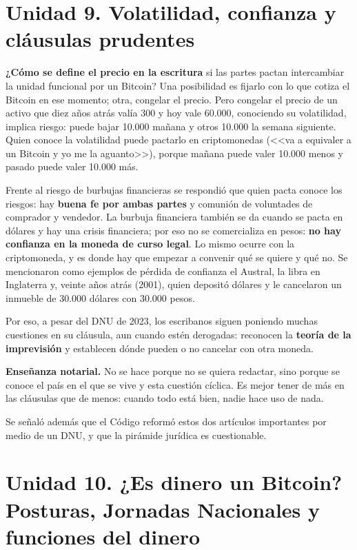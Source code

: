 \documentclass[12pt,oneside,a4paper]{book}
\begin{document}
\section{Unidad 9. Volatilidad, confianza y cláusulas prudentes}

\textbf{¿Cómo se define el precio en la escritura} si las partes pactan intercambiar la unidad funcional por un Bitcoin? Una posibilidad es fijarlo con lo que cotiza el Bitcoin en ese momento; otra, congelar el precio. Pero congelar el precio de un activo que diez años atrás valía 300 y hoy vale 60.000, conociendo su volatilidad, implica riesgo: puede bajar 10.000 mañana y otros 10.000 la semana siguiente. Quien conoce la volatilidad puede pactarlo en criptomonedas (<<va a equivaler a un Bitcoin y yo me la aguanto>>), porque mañana puede valer 10.000 menos y pasado puede valer 10.000 más.

Frente al riesgo de burbujas financieras se respondió que quien pacta conoce los riesgos: hay \textbf{buena fe por ambas partes} y comunión de voluntades de comprador y vendedor. La burbuja financiera también se da cuando se pacta en dólares y hay una crisis financiera; por eso no se comercializa en pesos: \textbf{no hay confianza en la moneda de curso legal}. Lo mismo ocurre con la criptomoneda, y es donde hay que empezar a convenir qué se quiere y qué no. Se mencionaron como ejemplos de pérdida de confianza el Austral, la libra en Inglaterra y, veinte años atrás (2001), quien depositó dólares y le cancelaron un inmueble de 30.000 dólares con 30.000 pesos.

Por eso, a pesar del DNU de 2023, los escribanos siguen poniendo muchas cuestiones en su cláusula, aun cuando estén derogadas: reconocen la \textbf{teoría de la imprevisión} y establecen dónde pueden o no cancelar con otra moneda.

\begin{important}
\textbf{Enseñanza notarial.} No se hace porque no se quiera redactar, sino porque se conoce el país en el que se vive y esta cuestión cíclica. Es mejor tener de más en las cláusulas que de menos: cuando todo está bien, nadie hace uso de nada.
\end{important}

Se señaló además que el Código reformó estos dos artículos importantes por medio de un DNU, y que la pirámide jurídica es cuestionable.

\section{Unidad 10. ¿Es dinero un Bitcoin? Posturas, Jornadas Nacionales y funciones del dinero}
\end{document}
